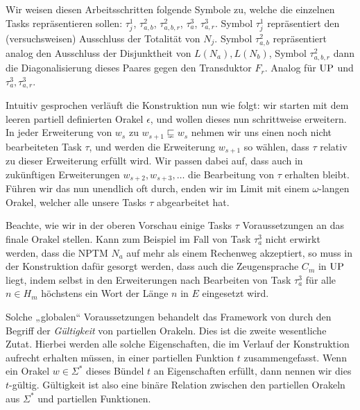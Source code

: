 Wir weisen diesen Arbeitsschritten folgende Symbole zu, welche die einzelnen Tasks repräsentieren sollen: $\tau^1_j$, $\tau^2_{a,b}$, $\tau^2_{a,b,r}$, $\tau^3_a$, $\tau^3_{a,r}$.
Symbol $\tau^1_j$ repräsentiert den (versuchsweisen) Ausschluss der Totalität von $N_j$. Symbol $\tau^2_{a,b}$ repräsentiert analog den Ausschluss der Disjunktheit von $L(N_a), L(N_b)$, Symbol $\tau^2_{a,b,r}$ dann die Diagonalisierung dieses Paares gegen den Transduktor $F_r$. Analog für $\mathrm{UP}$ und $\tau^3_a, \tau^3_{a,r}$.

Intuitiv gesprochen verläuft die Konstruktion nun wie folgt: wir starten mit dem leeren partiell definierten Orakel $\epsilon$, und wollen dieses nun schrittweise erweitern. In jeder Erweiterung von $w_s$ zu $w_{s+1}\sqsubsetneq w_s$ nehmen wir uns einen noch nicht bearbeiteten Task $\tau$, und werden die Erweiterung $w_{s+1}$ so wählen, dass $\tau$ relativ zu dieser Erweiterung erfüllt wird. Wir passen dabei auf, dass auch in zukünftigen Erweiterungen $w_{s+2}, w_{s+3}, \dots$ die Bearbeitung von $\tau$ erhalten bleibt.
Führen wir das nun unendlich oft durch, enden wir im Limit mit einem $\omega$-langen Orakel, welcher alle unsere Tasks $\tau$ abgearbeitet hat.

Beachte, wie wir in der oberen Vorschau einige Tasks $\tau$ Voraussetzungen an das finale Orakel stellen. Kann zum Beispiel im Fall von Task $\tau^3_a$ nicht erwirkt werden, dass die NPTM $N_a$ auf mehr als einem Rechenweg akzeptiert, so muss in der Konstruktion dafür gesorgt werden, dass auch die Zeugensprache $C_m$ in $\mathrm{UP}$ liegt, indem selbst in den Erweiterungen nach Bearbeiten von Task $\tau^3_a$ für alle $n\in H_m$ höchstens ein Wort der Länge $n$ in $E$ eingesetzt wird.

Solche „globalen“ Voraussetzungen behandelt das Framework von \citeauthor{dose_np-completeness_2019} durch den Begriff der \emph{Gültigkeit} von partiellen Orakeln. Dies ist die zweite wesentliche Zutat.
Hierbei werden alle solche Eigenschaften, die im Verlauf der Konstruktion aufrecht erhalten müssen, in einer partiellen Funktion $t$ zusammengefasst.
Wenn ein Orakel $w\in\Sigma^*$ dieses Bündel $t$ an Eigenschaften erfüllt, dann nennen wir dies $t$-gültig.
Gültigkeit ist also eine binäre Relation zwischen den partiellen Orakeln aus $\Sigma^*$ und partiellen Funktionen.


